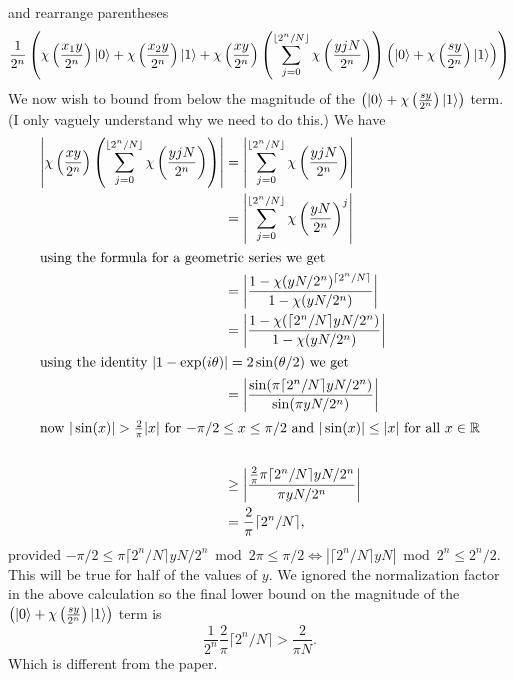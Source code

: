 \documentclass[10pt]{article}
\theoremstyle{plain}
\theoremstyle{definition}
\newcommand{\R}{\mathbb{R}}
\begin{document}
and rearrange parentheses
\[
    \frac{1}{2^n} \left(\chi\left(\frac{x_1y}{ 2^n}\right)\ket{0}
    + \chi\left(\frac{x_2y}{ 2^n}\right) \ket{1}
    + \chi\left(\frac{xy}{2^n}\right)
    \left(
        \sum_{j = 0}^{\lfloor 2^n / N \rfloor }
        \chi\left(\frac{yjN}{2^n}\right)
        \right)
    \left( \ket{0}  +    \chi\left(\frac{sy}{2^n}\right)  \ket{1} \right)\right)
\]
We now wish to bound from below the magnitude of the \( \left( \ket{0}  +    \chi\left(\frac{sy}{2^n}\right)  \ket{1} \right) \) term.
{
\color{red} (I only vaguely understand why we need to do this.)
}
We have
\begin{align*}
    \left | \chi\left(\frac{xy}{2^n}\right)\left(\sum_{j = 0}^{\lfloor 2^n / N \rfloor }\chi\left(\frac{yjN}{2^n}\right)\right) \right|
      & =  \left | \sum_{j = 0}^{\lfloor 2^n / N \rfloor }\chi\left(\frac{yjN}{2^n}\right) \right|     \\
      & = \left | \sum_{j = 0}^{\lfloor 2^n / N \rfloor }\chi\left(\frac{yN}{2^n}\right)^j \right|     \\
    \intertext{using the formula for a geometric series we get}
      & = \left | \frac{1-\chi(yN / 2^n )^{\lceil 2^n / N \rceil}}{1 - \chi(yN/2^n)} \right|           \\
      & = \left | \frac{1-\chi(\lceil 2^n / N \rceil yN / 2^n )}{1 - \chi(yN/2^n)} \right|             \\
    \intertext{using the identity \( |1-\exp(i\theta)| = 2\sin(\theta / 2) \) we get }
      & = \left | \frac{\sin(\pi \lceil 2^n / N \rceil yN / 2^{n} )}{\sin( \pi yN/2^{n})} \right|      \\
    \intertext{now \( |\sin(x)| > \frac{2}{\pi}|x| \) for \( -\pi / 2 \leq x \leq \pi / 2 \) and \( |\sin(x)| \leq |x| \) for all \( x \in \R \)} \\
      & \geq \left | \frac{\frac{2}{\pi} \pi \lceil 2^n / N \rceil yN / 2^{n} }{ \pi yN/2^{n}} \right| \\
      & = \frac{2}{\pi} \lceil 2^n / N \rceil ,
\end{align*}
provided \(-\pi / 2 \leq  \pi \lceil 2^n / N \rceil yN / 2^{n} \bmod{2\pi}   \leq \pi / 2 \Leftrightarrow \left| \lceil 2^n / N \rceil yN\right| \bmod{2^n} \leq 2^n/2\).
This will be true for half of the values of \( y \).
We ignored the normalization factor in the above calculation so the final lower bound on the magnitude of the \( \left( \ket{0}  +    \chi\left(\frac{sy}{2^n}\right)  \ket{1} \right) \) term is
\[
    \frac{1}{2^n}\frac{2}{\pi} \lceil 2^n / N \rceil > \frac{2}{\pi N}.
\]
Which is different from the paper.
\end{document}
